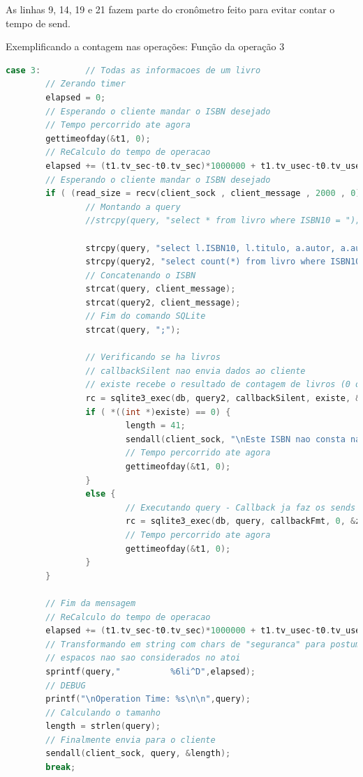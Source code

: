 \documentclass[10pt,a4paper]{report}
\begin{document}
As linhas 9, 14, 19 e 21 fazem parte do cronômetro feito para evitar contar o tempo de send.
\begin{center}
Exemplificando a contagem nas operações: Função da operação 3
\end{center}
\begin{lstlisting}[language=C]
case 3:         // Todas as informacoes de um livro
        // Zerando timer
        elapsed = 0;
        // Esperando o cliente mandar o ISBN desejado
        // Tempo percorrido ate agora
        gettimeofday(&t1, 0); 
        // ReCalculo do tempo de operacao
        elapsed += (t1.tv_sec-t0.tv_sec)*1000000 + t1.tv_usec-t0.tv_usec;
        // Esperando o cliente mandar o ISBN desejado
        if ( (read_size = recv(client_sock , client_message , 2000 , 0)) > 0 ) { 
                // Montando a query
                //strcpy(query, "select * from livro where ISBN10 = "); 

                strcpy(query, "select l.ISBN10, l.titulo, a.autor, a.autor2, a.autor3, a.autor4, l.descricao, l.editora, l.ano, l.estoque from livro l, autor a where l.autores=a.a_id and ISBN10 = ");
                strcpy(query2, "select count(*) from livro where ISBN10 = "); 
                // Concatenando o ISBN
                strcat(query, client_message);
                strcat(query2, client_message);
                // Fim do comando SQLite
                strcat(query, ";");

                // Verificando se ha livros
                // callbackSilent nao envia dados ao cliente
                // existe recebe o resultado de contagem de livros (0 ou 1)
                rc = sqlite3_exec(db, query2, callbackSilent, existe, &zErrMsg);
                if ( *((int *)existe) == 0) {
                        length = 41; 
                        sendall(client_sock, "\nEste ISBN nao consta na nossa livraria!\n",&length);
                        // Tempo percorrido ate agora
                        gettimeofday(&t1, 0); 
                }   
                else {
                        // Executando query - Callback ja faz os sends
                        rc = sqlite3_exec(db, query, callbackFmt, 0, &zErrMsg);
                        // Tempo percorrido ate agora
                        gettimeofday(&t1, 0); 
                }   
        }   

        // Fim da mensagem
        // ReCalculo do tempo de operacao
        elapsed += (t1.tv_sec-t0.tv_sec)*1000000 + t1.tv_usec-t0.tv_usec;
        // Transformando em string com chars de "seguranca" para postumo atoi
        // espacos nao sao considerados no atoi
        sprintf(query,"          %6li^D",elapsed);
        // DEBUG
        printf("\nOperation Time: %s\n\n",query);
        // Calculando o tamanho
        length = strlen(query);
        // Finalmente envia para o cliente
        sendall(client_sock, query, &length);
        break;
\end{lstlisting}
\end{document}
